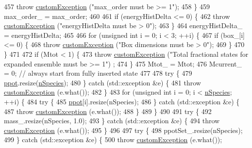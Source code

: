 \begin{DoxyCode}
457         \textcolor{keywordflow}{throw} \hyperlink{classcustom_exception}{customException} (\textcolor{stringliteral}{"max\_order must be >= 1"});
458     \}
459     max\_order\_ = max\_order;
460 
461     \textcolor{keywordflow}{if} (energyHistDelta <= 0) \{
462         \textcolor{keywordflow}{throw} \hyperlink{classcustom_exception}{customException} (\textcolor{stringliteral}{"energyHistDelta must be > 0"});
463     \}
464     energyHistDelta\_ = energyHistDelta;
465 
466     \textcolor{keywordflow}{for} (\textcolor{keywordtype}{unsigned} \textcolor{keywordtype}{int} i = 0; i < 3; ++i) \{
467         \textcolor{keywordflow}{if} (box\_[i] <= 0) \{
468             \textcolor{keywordflow}{throw} \hyperlink{classcustom_exception}{customException} (\textcolor{stringliteral}{"Box dimensions must be > 0"});
469         \}
470     \}
471 
472     \textcolor{keywordflow}{if} (Mtot < 1) \{
473         \textcolor{keywordflow}{throw} \hyperlink{classcustom_exception}{customException} (\textcolor{stringliteral}{"Total fractional states for expanded ensemble must be >= 1"})
      ;
474     \}
475     Mtot\_ = Mtot;
476     Mcurrent\_ = 0; \textcolor{comment}{// always start from fully inserted state}
477 
478     \textcolor{keywordflow}{try} \{
479         \hyperlink{classsim_system_ad2e290b5963f132e6a3a56cee35c8e9f}{ppot}.resize(\hyperlink{classsim_system_ab5e2e9b6204de15520302fe1d51688dd}{nSpecies});
480     \} \textcolor{keywordflow}{catch} (std::exception &e) \{
481         \textcolor{keywordflow}{throw} \hyperlink{classcustom_exception}{customException} (e.what());
482     \}
483     \textcolor{keywordflow}{for} (\textcolor{keywordtype}{unsigned} \textcolor{keywordtype}{int} i = 0; i < \hyperlink{classsim_system_ab5e2e9b6204de15520302fe1d51688dd}{nSpecies}; ++i) \{
484         \textcolor{keywordflow}{try} \{
485             \hyperlink{classsim_system_ad2e290b5963f132e6a3a56cee35c8e9f}{ppot}[i].resize(nSpecies);
486         \} \textcolor{keywordflow}{catch} (std::exception &e) \{
487             \textcolor{keywordflow}{throw} \hyperlink{classcustom_exception}{customException} (e.what());
488         \}
489     \}
490 
491     \textcolor{keywordflow}{try} \{
492         mass\_.resize(nSpecies, 1.0);
493     \} \textcolor{keywordflow}{catch} (std::exception &e) \{
494         \textcolor{keywordflow}{throw} \hyperlink{classcustom_exception}{customException} (e.what());
495     \}
496 
497     \textcolor{keywordflow}{try} \{
498         ppotSet\_.resize(nSpecies);
499     \} \textcolor{keywordflow}{catch} (std::exception &e) \{
500         \textcolor{keywordflow}{throw} \hyperlink{classcustom_exception}{customException} (e.what());

\end{DoxyCode}
